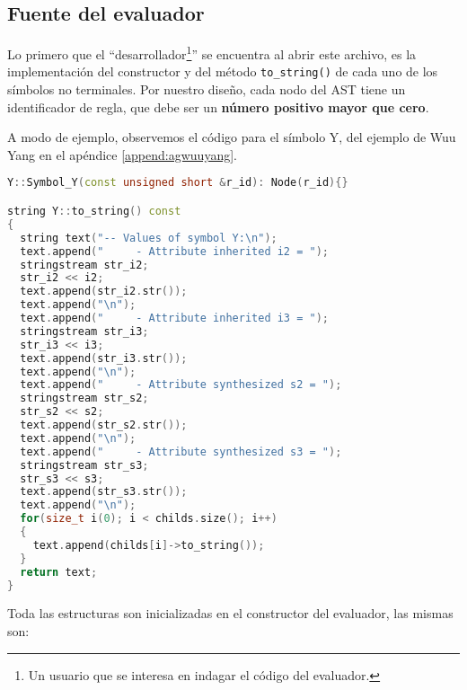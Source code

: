 \subsection{Fuente del evaluador}

Lo primero que el ``desarrollador\footnote{Un usuario que se interesa en indagar el código del evaluador.}'' se encuentra al abrir este archivo, es la implementación del constructor y del método \texttt{to\_string()} de cada uno de los símbolos no terminales. Por nuestro diseño, cada nodo del AST tiene un identificador de regla, que debe ser un \textbf{número positivo mayor que cero}.

A modo de ejemplo, observemos el código para el símbolo Y, del ejemplo de Wuu Yang en el apéndice \ref{append:agwuuyang}.

\begin{lstlisting}[language=C++, basicstyle=\scriptsize, columns=fullflexible, linewidth=9cm]
Y::Symbol_Y(const unsigned short &r_id): Node(r_id){}

string Y::to_string() const
{
  string text("-- Values of symbol Y:\n");
  text.append("     - Attribute inherited i2 = ");
  stringstream str_i2;
  str_i2 << i2;
  text.append(str_i2.str());
  text.append("\n");
  text.append("     - Attribute inherited i3 = ");
  stringstream str_i3;
  str_i3 << i3;
  text.append(str_i3.str());
  text.append("\n");
  text.append("     - Attribute synthesized s2 = ");
  stringstream str_s2;
  str_s2 << s2;
  text.append(str_s2.str());
  text.append("\n");
  text.append("     - Attribute synthesized s3 = ");
  stringstream str_s3;
  str_s3 << s3;
  text.append(str_s3.str());
  text.append("\n");
  for(size_t i(0); i < childs.size(); i++)
  {
    text.append(childs[i]->to_string());
  }
  return text;
}
\end{lstlisting}

Toda las estructuras son inicializadas en el constructor del evaluador, las mismas son:

